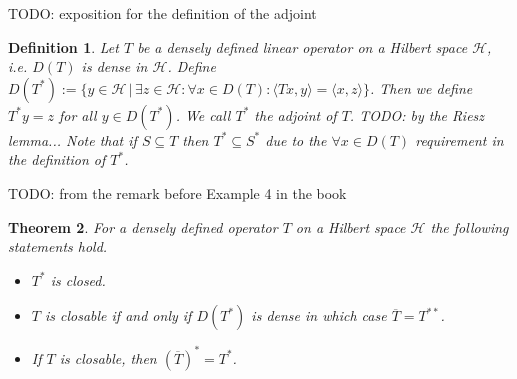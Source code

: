 \documentclass[12pt,oneside]{report}
\newtheorem{thm}{Theorem}[chapter]
\newtheorem{defn}[thm]{Definition}
\begin{document}
TODO: exposition for the definition of the adjoint

\begin{defn}
    Let $T$ be a densely defined linear operator on a Hilbert space $\mathscr{H}$, i.e. $D(T)$ is dense in $\mathscr{H}$. Define $D(T^{*}) := \{ y \in \mathscr{H} \, | \, \exists z \in \mathscr{H}: \forall x \in D(T): \langle Tx,y \rangle = \langle x, z \rangle \}$. Then we define $T^{*}y = z$ for all $y \in D(T^{*})$. We call $T^{*}$ the adjoint of $T$. TODO: by the Riesz lemma... Note that if $S \subseteq T$ then $T^{*} \subseteq S^{*}$ due to the $\forall x \in D(T)$ requirement in the definition of $T^{*}$.
\end{defn}

TODO: from the remark before Example 4 in the book

\begin{thm}
    For a densely defined operator $T$ on a Hilbert space $\mathscr{H}$ the following statements hold. 
    \begin{itemize}
        \item $T^{*}$ is closed.
        \item $T$ is closable if and only if $D(T^{*})$ is dense in which case $\overline{T} = T^{**}$.
        \item If $T$ is closable, then $(\overline{T})^{*} = T^{*}$.
    \end{itemize}
\end{thm}
\end{document}
